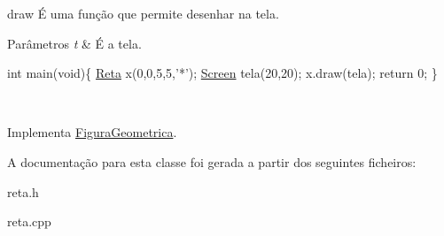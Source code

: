 draw É uma função que permite desenhar na tela. 


\begin{DoxyParams}{Parâmetros}
{\em t} & É a tela. 
\begin{DoxyPre}
int main(void)\{
     \mbox{\hyperlink{class_reta}{Reta}} x(0,0,5,5,'*');
     \mbox{\hyperlink{class_screen}{Screen}} tela(20,20);
     x.draw(tela);
     return 0;
\}
\end{DoxyPre}
 \\
\hline
\end{DoxyParams}


Implementa \mbox{\hyperlink{class_figura_geometrica_a8ee8dedc060b6059a805ea091aef2c41}{Figura\+Geometrica}}.



A documentação para esta classe foi gerada a partir dos seguintes ficheiros\+:\begin{DoxyCompactItemize}
\item 
reta.\+h\item 
reta.\+cpp\end{DoxyCompactItemize}
